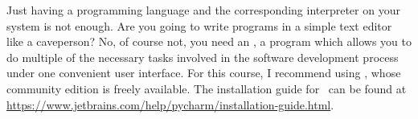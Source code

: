 %
\label{sec:installingPyCharm}%
%
Just having a programming language and the corresponding interpreter on your system is not enough.
Are you going to write programs in a simple text editor like a caveperson?
No, of course not, you need an , a program which allows you to do multiple of the necessary tasks involved in the software development process under one convenient user interface.
For this course, I recommend using \pycharm, whose community edition is freely available.
The installation guide for \pycharm\ can be found at \url{https://www.jetbrains.com/help/pycharm/installation-guide.html}.%
%
%
%
\afterpage{\clearpage}%
\endhsection%
%
